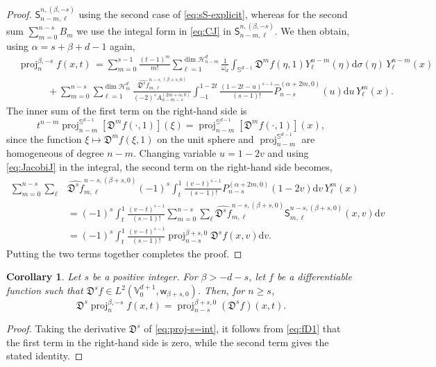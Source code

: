 \documentclass{amsart}
\newtheorem{cor}[thm]{Corollary}
\theoremstyle{remark}
\def\d{\mathrm{d}}
\def\sph{{\mathbb{S}^{d-1}}}
\def\sw{{\mathsf w}}
\def\sS{{\mathsf S}}
\def\fD{{\mathfrak D}}
\def\a{{\alpha}}
\def\b{{\beta}}
\def\o{{\omega}}
\def\s{\sigma}
\def\CH{{\mathcal H}}
\def\VV{{\mathbb V}}
\def\proj{\operatorname{proj}}
\newcommand{\wh}{\widehat}
\begin{document}
\begin{proof}
$\sS_{n-m,\ell}^{n, (\b,-s)}$ using the second case of \eqref{eq:sS-explicit}, whereas for the second sum $\sum_{m=0}^{n-s} B_m$
we use the integal form in \eqref{eq:CJ} in $\sS_{n-m,\ell}^{n, (\b,-s)}$. We then obtain, using $\a = s+\b+d-1$ again, 
\begin{align*}
 & \proj_n^{\b,-s} f(x,t) \, = \sum_{m=0}^{s-1} \frac{(t-1)^m}{m!}
      \sum_{\ell=1}^{\dim \CH_{n-m}^d} \frac{1}{\o_d} \int_{\sph}
         \fD^{m} f(\eta,1) Y_\ell^{n-m} (\eta)\d \s(\eta)\,Y_\ell^{n-m} (x) \\
   & \qquad\quad
    + \sum_{m = 0}^{n-s} \sum_{\ell=1}^{\dim \CH_{m}^d}
       \frac{ \wh{\fD^s f}_{m,\ell}^{n-s, (\b+s,0)}}{(-2)^{s} A_{n-m-s}^{(2m+\a,0)}}
        \int_{-1}^{1-2t} \frac{(1-2t -u)^{s-1}}{(s-1)!} \wh P_{n-s}^{(\a+2m,0)}(u) \d u \, Y_\ell^m(x).
 \end{align*}
The inner sum of the first term on the right-hand side is
$$
t^{n-m} \proj_{n-m}^\sph [\fD^m f(\cdot,1)](\xi) = \proj_{n-m}^\sph [\fD^m f(\cdot,1)](x),
$$
since the function $\xi \mapsto \fD^m f(\xi,1)$ on the unit sphere and $\proj_{n-m}^\sph$ are homogeneous of degree
$n-m$. Changing variable $u = 1-2v$ and using \eqref{eq:JacobiJ} in the integral, the second term on the right-hand side becomes,
\begin{align*}
  \sum_{m = 0}^{n-s} \sum_{\ell} & \wh{\fD^s f}_{m,\ell}^{n-s, (\b+s,0)}  (-1)^s
        \int_{t}^{1} \frac{(v-t)^{s-1}}{(s-1)!} P_{n-s}^{(\a+2m,0)}(1-2v) \d v \, Y_\ell^m(x) \\
   & = (-1)^s  \int_{t}^{1}  \frac{(v-t)^{s-1}}{(s-1)!}  \sum_{m = 0}^{n-s} \sum_{\ell}
     \wh{\fD^s f}_{m,\ell}^{n-s, (\b+s,0)}  \sS_{m,\ell}^{n-s, (\b+s,0)} (x,v) \d v\\
  &  =  (-1)^s \int_{t}^{1} \frac{(v-t)^{s-1}}{(s-1)!} \proj_{n-s}^{\b+s,0}\fD^s f (x, v) \d v.
\end{align*}
Putting the two terms together completes the proof.
\end{proof}

\begin{cor}\label{cor:proj-partial}
Let $s$ be a positive integer. For $\b > -d-s$, let $f$ be a differentiable function such that
$\fD^s f \in L^2(\VV_0^{d+1}, \sw_{\b+s,0})$. Then, for $n  \ge s$,
$$
  \fD^s \proj_n^{\b,-s} f(x,t) = \proj_{n-s}^{\b+s,0}\left(\fD^s f\right) (x,t).
$$
\end{cor}

\begin{proof}
Taking the derivative $\fD^s$ of \eqref{eq:proj-s=int}, it follows from \eqref{eq:fD1} that the first term in the right-hand
side is zero, while the second term gives the stated identity.
\end{proof}
\end{document}
